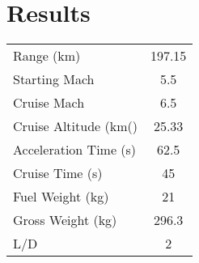 \section{Results}


\begin{center}
\begin{tabular}{l c}
Range (km) & 197.15 \\
Starting Mach & 5.5 \\
Cruise Mach & 6.5 \\
Cruise Altitude (km()& 25.33 \\
Acceleration Time (s) & 62.5 \\
Cruise Time (s) & 45 \\
Fuel Weight (kg) & 21 \\
Gross Weight (kg) & 296.3 \\
L/D & 2
\end{tabular}
\end{center}


